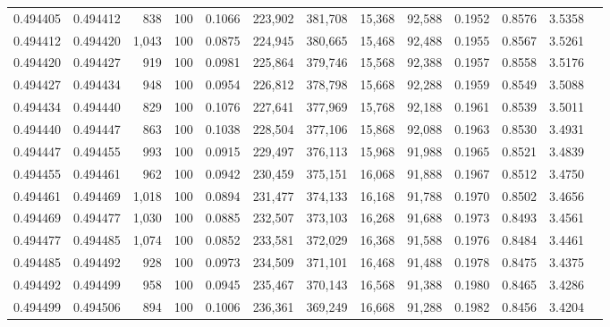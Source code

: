 \begin{tabular}{rrrrrrrrrrrrr}
0.494405 & 0.494412 &   838 & 100 &                                     0.1066 & 223,902 & 381,708 &  15,368 &  92,588 & 0.1952 & 0.8576 & 3.5358 \\
0.494412 & 0.494420 & 1,043 & 100 &                                     0.0875 & 224,945 & 380,665 &  15,468 &  92,488 & 0.1955 & 0.8567 & 3.5261 \\
0.494420 & 0.494427 &   919 & 100 &                                     0.0981 & 225,864 & 379,746 &  15,568 &  92,388 & 0.1957 & 0.8558 & 3.5176 \\
0.494427 & 0.494434 &   948 & 100 &                                     0.0954 & 226,812 & 378,798 &  15,668 &  92,288 & 0.1959 & 0.8549 & 3.5088 \\
0.494434 & 0.494440 &   829 & 100 &                                     0.1076 & 227,641 & 377,969 &  15,768 &  92,188 & 0.1961 & 0.8539 & 3.5011 \\
0.494440 & 0.494447 &   863 & 100 &                                     0.1038 & 228,504 & 377,106 &  15,868 &  92,088 & 0.1963 & 0.8530 & 3.4931 \\
0.494447 & 0.494455 &   993 & 100 &                                     0.0915 & 229,497 & 376,113 &  15,968 &  91,988 & 0.1965 & 0.8521 & 3.4839 \\
0.494455 & 0.494461 &   962 & 100 &                                     0.0942 & 230,459 & 375,151 &  16,068 &  91,888 & 0.1967 & 0.8512 & 3.4750 \\
0.494461 & 0.494469 & 1,018 & 100 &                                     0.0894 & 231,477 & 374,133 &  16,168 &  91,788 & 0.1970 & 0.8502 & 3.4656 \\
0.494469 & 0.494477 & 1,030 & 100 &                                     0.0885 & 232,507 & 373,103 &  16,268 &  91,688 & 0.1973 & 0.8493 & 3.4561 \\
0.494477 & 0.494485 & 1,074 & 100 &                                     0.0852 & 233,581 & 372,029 &  16,368 &  91,588 & 0.1976 & 0.8484 & 3.4461 \\
0.494485 & 0.494492 &   928 & 100 &                                     0.0973 & 234,509 & 371,101 &  16,468 &  91,488 & 0.1978 & 0.8475 & 3.4375 \\
0.494492 & 0.494499 &   958 & 100 &                                     0.0945 & 235,467 & 370,143 &  16,568 &  91,388 & 0.1980 & 0.8465 & 3.4286 \\
0.494499 & 0.494506 &   894 & 100 &                                     0.1006 & 236,361 & 369,249 &  16,668 &  91,288 & 0.1982 & 0.8456 & 3.4204 \\

\end{tabular}
